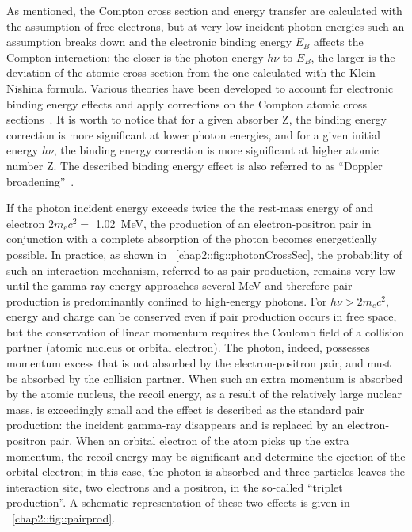 As mentioned, the Compton cross section and energy transfer are calculated with the assumption of free electrons, but at very low incident photon energies such an assumption breaks down and the electronic binding energy $E_B$ affects the Compton interaction: the closer is the photon energy $h\nu$ to $E_B$, the larger is the deviation of the atomic cross section from the one calculated with the Klein-Nishina formula. Various theories have been developed to account for electronic binding energy effects and apply corrections on the Compton atomic cross sections~\parencite{Bergstrom1997}. It is worth to notice that for a given absorber Z, the binding energy correction is more significant at lower photon energies, and for a given initial energy $h\nu$, the binding energy correction is more significant at higher atomic number Z. The described binding energy effect is also referred to as \enquote{Doppler broadening}~\parencite{DuMond1928, DuMond1929}. 
   
If the photon incident energy exceeds twice the the rest-mass energy of and electron  $2m_ec^2 = $ 1.02~MeV, the production of an electron-positron pair in conjunction with a complete absorption of the photon becomes energetically possible. In practice, as shown in \figurename~\ref{chap2::fig::photonCrossSec},  the probability of such an interaction mechanism, referred to as pair production, remains very low until the gamma-ray energy approaches several MeV and therefore pair production is predominantly confined to high-energy photons. For $h\nu > 2m_ec^2$, energy and charge can be conserved even if pair production occurs in free space, but the conservation of linear momentum requires the Coulomb field of a collision partner (atomic nucleus or orbital electron). The photon, indeed, possesses momentum excess that is not absorbed by the electron-positron pair, and must be absorbed by the collision partner. When such an extra momentum is absorbed by the atomic nucleus, the recoil energy, as a result of the relatively large nuclear mass, is exceedingly small and the effect is described as the standard pair production: the incident gamma-ray disappears and is replaced by an electron-positron pair. When an orbital electron of the atom picks up the extra momentum, the recoil energy may be significant and determine the ejection of the orbital electron; in this case, the photon is absorbed and three particles leaves the interaction site, two electrons and a positron, in the so-called \enquote{triplet production}. A schematic representation of these two effects is given in \figurename~\ref{chap2::fig::pairprod}.

